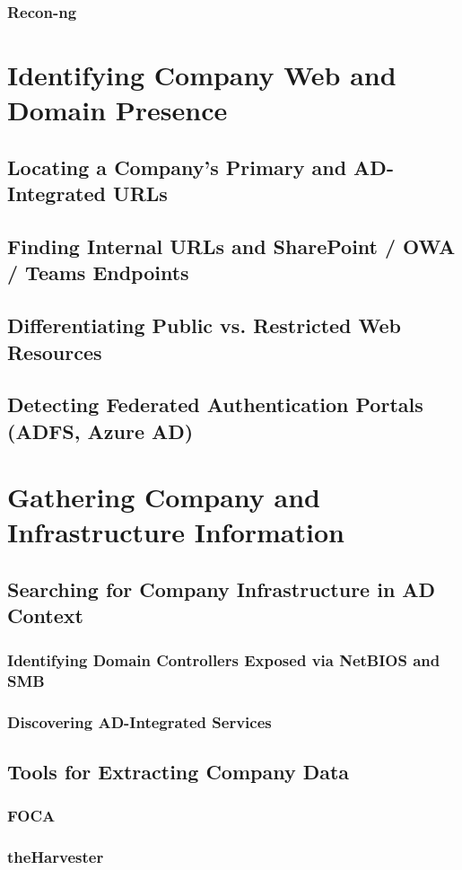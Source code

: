 \documentclass{article}
\begin{document}
\subsubsection{Recon-ng}
\section{Identifying Company Web and Domain Presence}
\subsection{Locating a Company's Primary and AD-Integrated URLs}
\subsection{Finding Internal URLs and SharePoint / OWA / Teams Endpoints}
\subsection{Differentiating Public vs. Restricted Web Resources}
\subsection{Detecting Federated Authentication Portals (ADFS, Azure AD)}
\section{Gathering Company and Infrastructure Information}
\subsection{Searching for Company Infrastructure in AD Context}
\subsubsection{Identifying Domain Controllers Exposed via NetBIOS and SMB}
\subsubsection{Discovering AD-Integrated Services}
\subsection{Tools for Extracting Company Data}
\subsubsection{FOCA}
\subsubsection{theHarvester}
\end{document}
